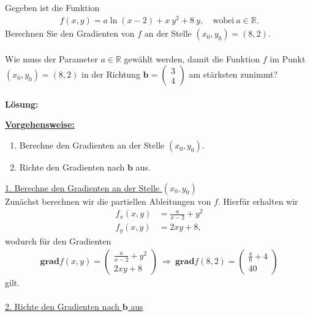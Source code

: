 \subsection*{}
Gegeben ist die Funktion
\begin{align*}
f(x,y) = a \ln(x-2) + x \ y^2 + 8 \ y, \quad \textrm{wobei} \ a \in \mathbb{R}.
\end{align*}
Berechnen Sie den Gradienten von $ f $ an der Stelle $ (x_0,y_0) = (8,2) $.\\
\\
Wie muss der Parameter $ a \in \mathbb{R} $ gewählt werden, damit die Funktion $ f $ im Punkt $ (x_0,y_0) = (8,2) $ in der Richtung
$ \textbf{b} = \begin{pmatrix}
3 \\
4
\end{pmatrix} $ am stärksten zunimmt?\\
\\
\textbf{Lösung:}
\begin{mdframed}
\underline{\textbf{Vorgehensweise:}}
\begin{enumerate}
\renewcommand{\labelenumi}{\theenumi.}
\item Berechne den Gradienten an der Stelle $ (x_0,y_0) $.
\item Richte den Gradienten nach $ \textbf{b} $ aus.
\end{enumerate}
\end{mdframed}
\underline{1. Berechne den Gradienten an der Stelle $ (x_0,y_0) $}\\
Zunächst berechnen wir die partiellen Ableitungen von $ f $. Hierfür erhalten wir
\begin{align*}
f_x(x,y) &=  \frac{a}{x-2}+ y^2 \\
f_y(x,y) &= 2 xy + 8,
\end{align*}
wodurch für den Gradienten
\begin{align*}
\textbf{grad}f(x,y)
= \begin{pmatrix}
\frac{a}{x-2} +y^2\\
2xy +8
\end{pmatrix}
\ \Rightarrow \
\textbf{grad}f(8,2) =
\begin{pmatrix}
\frac{a}{6} + 4\\
40
\end{pmatrix}
\end{align*}
gilt.\\
\\
\underline{2. Richte den Gradienten nach $ \textbf{b} $ aus}\\
